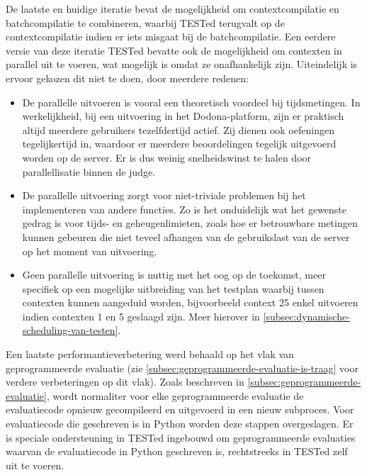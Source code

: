 De laatste en huidige iteratie bevat de mogelijkheid om contextcompilatie en batchcompilatie te combineren, waarbij TESTed terugvalt op de contextcompilatie indien er iets misgaat bij de batchcompilatie.
Een eerdere versie van deze iteratie TESTed bevatte ook de mogelijkheid om contexten in parallel uit te voeren, wat mogelijk is omdat ze onafhankelijk zijn.
Uiteindelijk is ervoor gekozen dit niet te doen, door meerdere redenen:

\begin{itemize}
    \item De parallelle uitvoeren is vooral een theoretisch voordeel bij tijdsmetingen.
    In werkelijkheid, bij een uitvoering in het Dodona-platform, zijn er praktisch altijd meerdere gebruikers tezelfdertijd actief.
    Zij dienen ook oefeningen tegelijkertijd in, waardoor er meerdere beoordelingen tegelijk uitgevoerd worden op de server.
    Er is dus weinig snelheidswinst te halen door parallellisatie binnen de judge.
    \item De parallelle uitvoering zorgt voor niet-triviale problemen bij het implementeren van andere functies.
    Zo is het onduidelijk wat het gewenste gedrag is voor tijds- en geheugenlimieten, zoals hoe er betrouwbare metingen kunnen gebeuren die niet teveel afhangen van de gebruikslast van de server op het moment van uitvoering.
    \item Geen parallelle uitvoering is nuttig met het oog op de toekomst, meer specifiek op een mogelijke uitbreiding van het testplan waarbij  tussen contexten kunnen aangeduid worden, bijvoorbeeld context 25 enkel uitvoeren indien contexten 1 en 5 geslaagd zijn.
    Meer hierover in \cref{subsec:dynamische-scheduling-van-testen}.
\end{itemize}

Een laatste performantieverbetering werd behaald op het vlak van geprogrammeerde evaluatie (zie \cref{subsec:geprogrammeerde-evaluatie-is-traag} voor verdere verbeteringen op dit vlak).
Zoals beschreven in \cref{subsec:geprogrammeerde-evaluatie}, wordt normaliter voor elke geprogrammeerde evaluatie de evaluatiecode opnieuw gecompileerd en uitgevoerd in een nieuw subproces.
Voor evaluatiecode die geschreven is in Python worden deze stappen overgeslagen.
Er is speciale ondersteuning in TESTed ingebouwd om geprogrammeerde evaluaties waarvan de evaluatiecode in Python geschreven is, rechtstreeks in TESTed zelf uit te voeren.

